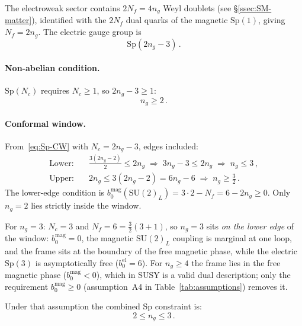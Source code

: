 \documentclass[11pt,a4paper]{article}
\theoremstyle{plain}
\theoremstyle{definition}
\theoremstyle{remark}
\newcommand{\Nc}{N_{\!c}}
\newcommand{\Nf}{N_{\!f}}
\newcommand{\ngen}{n_g}
\newcommand{\SU}[1]{\mathrm{SU}(#1)}
\newcommand{\Sp}[1]{\mathrm{Sp}(#1)}
\begin{document}
The electroweak sector contains $2\Nf = 4\ngen$ Weyl doublets (see
\S\ref{ssec:SM-matter}), identified with the $2\Nf$ dual quarks of the
magnetic $\Sp{1}$, giving $\Nf = 2\ngen$.
The electric gauge group is
\begin{equation}\label{eq:Sp-electric}
  \boxed{\Sp{2\ngen - 3}}\,.
\end{equation}

\paragraph{Non-abelian condition.}
$\Sp{\Nc}$ requires $\Nc \geq 1$, so $2\ngen - 3 \geq 1$:
\begin{equation}\label{eq:Sp-bound}
  \boxed{\ngen \geq 2}\,.
\end{equation}

\paragraph{Conformal window.}
From~\eqref{eq:Sp-CW} with $\Nc = 2\ngen - 3$, edges included:
\begin{align}
  \text{Lower:}&\quad \frac{3(2\ngen - 2)}{2} \leq 2\ngen
  \;\Longrightarrow\;
  3\ngen - 3 \leq 2\ngen
  \;\Longrightarrow\;
  \ngen \leq 3\,,
  \label{eq:Sp-CW-lower} \\
  \text{Upper:}&\quad 2\ngen \leq 3(2\ngen - 2) = 6\ngen - 6
  \;\Longrightarrow\;
  \ngen \geq \frac{3}{2}\,.
  \label{eq:Sp-CW-upper}
\end{align}
The lower-edge condition is
$b_0^{\mathrm{mag}}(\SU{2}_L) = 3 \cdot 2 - \Nf = 6 - 2\ngen \geq 0$.
Only $\ngen = 2$ lies strictly inside the window.

For $\ngen = 3$: $\Nc = 3$ and $\Nf = 6 = \frac{3}{2}(3 + 1)$, so
$\ngen = 3$ sits \emph{on the lower edge} of the window:
$b_0^{\mathrm{mag}} = 0$, the magnetic $\SU{2}_L$ coupling is marginal at
one loop, and the frame sits at the boundary of the free magnetic phase,
while the electric $\Sp{3}$ is asymptotically free
($b_0^{\mathrm{el}} = 6$).  For $\ngen \geq 4$ the frame lies in the free
magnetic phase ($b_0^{\mathrm{mag}} < 0$), which in SUSY is a valid dual
description; only the requirement $b_0^{\mathrm{mag}} \geq 0$
(assumption~A4 in Table~\ref{tab:assumptions}) removes it.

Under that assumption the combined Sp constraint is:
\begin{equation}\label{eq:Sp-combined}
  \boxed{2 \leq \ngen \leq 3}\,.
\end{equation}
\end{document}
